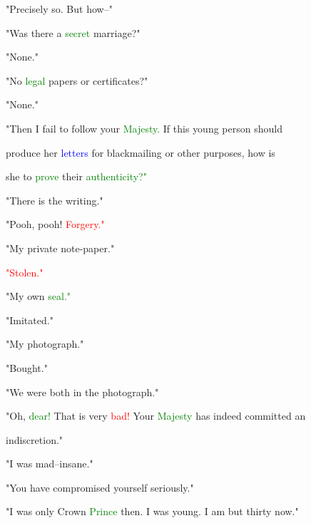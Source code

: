  "Precisely so. But how--"



 "Was there a \textcolor{green}{secret} \textcolor{BurntOrange}{marriage?"}



 "None."



 "No \textcolor{green}{legal} papers or certificates?"



 "None."



 "Then I fail to follow your \textcolor{green}{Majesty.} If this \textcolor{BurntOrange}{young} person should

 produce her \textcolor{blue}{letters} for blackmailing or other purposes, how is

 she to \textcolor{green}{prove} their \textcolor{green}{authenticity?"}



 "There is the writing."



 "Pooh, pooh! \textcolor{red}{Forgery."}



 "My private note-paper."



 \textcolor{red}{"Stolen."}



 "My own \textcolor{green}{seal."}



 "Imitated."



 "My photograph."



 "Bought."



 "We were both in the photograph."



 "Oh, \textcolor{green}{dear!} That is very \textcolor{red}{bad!} Your \textcolor{green}{Majesty} has indeed committed an

 indiscretion."



 "I was mad--insane."



 "You have compromised yourself seriously."



 "I was only Crown \textcolor{green}{Prince} then. I was \textcolor{BurntOrange}{young.} I am but thirty now."



